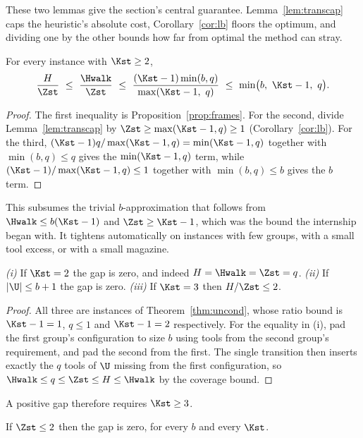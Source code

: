 These two lemmas give the section's central guarantee. Lemma~\ref{lem:transcap} caps
the heuristic's absolute cost, Corollary~\ref{cor:lb} floors the optimum, and
dividing one by the other bounds how far from optimal the method can stray.

\begin{theorem}\label{thm:uncond}
For every instance with $\Kst\ge2$,
\[
  \frac{H}{\Zst}\ \le\ \frac{\Hwalk}{\Zst}
  \ \le\ \frac{(\Kst-1)\min(b,q)}{\max(\Kst-1,\ q)}
  \ \le\ \min\bigl(b,\ \Kst-1,\ q\bigr).
\]
\end{theorem}

\begin{proof}
The first inequality is Proposition~\ref{prop:frames}. For the second, divide
Lemma~\ref{lem:transcap} by $\Zst\ge\max(\Kst-1,q)\ge1$ (Corollary~\ref{cor:lb}). For
the third, $(\Kst-1)q/\max(\Kst-1,q)=\min(\Kst-1,q)$ together with $\min(b,q)\le q$
gives the $\min(\Kst-1,q)$ term, while $(\Kst-1)/\max(\Kst-1,q)\le1$ together with
$\min(b,q)\le b$ gives the $b$ term.
\end{proof}

This subsumes the trivial $b$-approximation that follows from
$\Hwalk\le b(\Kst-1)$ and $\Zst\ge\Kst-1$, which was the bound the internship began
with. It tightens automatically on instances with few groups, with a small tool
excess, or with a small magazine.

\begin{corollary}\label{cor:zerogap}
\emph{(i)} If $\Kst=2$ the gap is zero, and indeed $H=\Hwalk=\Zst=q$.
\emph{(ii)} If $\lvert\U\rvert\le b+1$ the gap is zero.
\emph{(iii)} If $\Kst=3$ then $H/\Zst\le2$.
\end{corollary}

\begin{proof}
All three are instances of Theorem~\ref{thm:uncond}, whose ratio bound is
$\Kst-1=1$, $q\le1$ and $\Kst-1=2$ respectively. For the equality in (i), pad the
first group's configuration to size $b$ using tools from the second group's
requirement, and pad the second from the first. The single transition then inserts
exactly the $q$ tools of $\U$ missing from the first configuration, so
$\Hwalk\le q\le\Zst\le H\le\Hwalk$ by the coverage bound.
\end{proof}

A positive gap therefore requires $\Kst\ge3$.

\begin{corollary}\label{cor:smallZ}
If $\Zst\le2$ then the gap is zero, for every $b$ and every $\Kst$.
\end{corollary}

